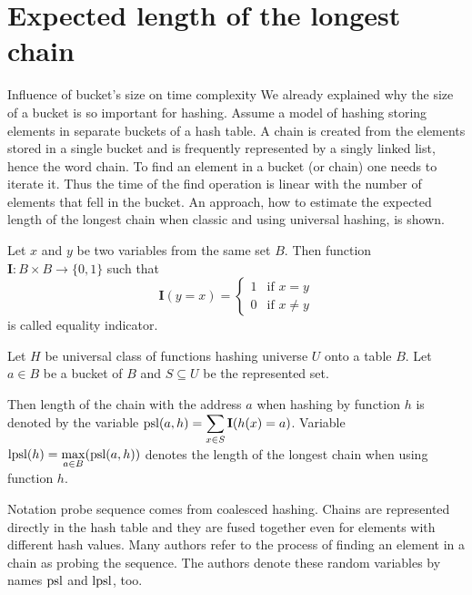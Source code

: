 \chapter{Expected length of the longest chain}

\begin{section}{Influence of bucket's size on time complexity}
We already explained why the size of a bucket is so important for hashing. Assume a model of hashing storing elements in separate buckets of a hash table. A chain is created from the elements stored in a single bucket and is frequently represented by a singly linked list, hence the word chain. To find an element in a bucket (or chain) one needs to iterate it. Thus the time of the find operation is linear with the number of elements that fell in the bucket. An approach, how to estimate the expected length of the longest chain when classic and using universal hashing, is shown.

\begin{definition}
Let $x$ and $y$ be two variables from the same set $B$. Then function $\mathbf{I}: B \times B \rightarrow \{0, 1\}$ such that
\[
 \mathbf{I}(y = x) =
  \begin{cases}
   1 & \text{if } x = y \\
   0 & \text{if } x \neq y
  \end{cases}
\]
is called equality indicator.
\end{definition}

\begin{definition}
Let $H$ be universal class of functions hashing universe $U$ onto a table $B$. Let $a \in B$ be a bucket of $B$ and $S \subseteq U$ be the represented set. 

Then length of the chain with the address $a$ when hashing by function $h$ is denoted by the variable $\mathrm{psl}(a, h) = \displaystyle \sum_{x \in S} \mathbf{I}(h(x) = a)$. Variable $\mathrm{lpsl}(h) = \displaystyle \max_{a \in B} (\mathrm{psl}(a, h))$ denotes the length of the longest chain when using function $h$.
\end{definition}

Notation probe sequence comes from coalesced hashing. Chains are represented directly in the hash table and they are fused together even for elements with different hash values. Many authors refer to the process of finding an element in a chain as probing the sequence. The authors denote these random variables by names $\mathrm{psl}$ and $\mathrm{lpsl}$, too. %


\end{section}
